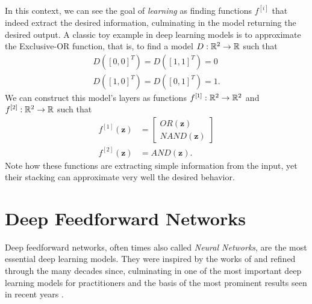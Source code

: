 In this context, we can see the goal of \textit{learning} as finding functions $f^{[i]}$ that indeed extract the desired information, culminating in the model returning the desired output.
A classic toy example in deep learning models is to approximate the Exclusive-OR function, that is, to find a model $D : \mathbb{R}^2 \to \mathbb{R}$ such that
\begin{align*}
    D([0,0]^T) = D([1,1]^T) = 0 \\
    D([1,0]^T) = D([0,1]^T) = 1 
.\end{align*}
We can construct this model's layers as functions $f^{[1]}:\mathbb{R}^2\to\mathbb{R}^2$ and $f^{[2]}:\mathbb{R}^2\to\mathbb{R}$ such that
\begin{align*}
    f^{[1]}(\bm{z}) &= \begin{bmatrix}
    OR(\bm{z}) \\
    NAND(\bm{z})
    \end{bmatrix} \\
    f^{[2]}(\bm{z}) &= AND(\bm{z})
.\end{align*}
Note how these functions are extracting simple information from the input, yet their stacking can approximate very well the desired behavior.

\section{Deep Feedforward Networks}\label{sec:neural-nets}

Deep feedforward networks, often times also called \emph{Neural Networks}\footnotemark, are the most essential deep learning models.
They were inspired by the works of \textcite{rosenblatt_perceptron_1957} and refined through the many decades since, culminating in one of the most important deep learning models for practitioners and the basis of the most prominent results seen in recent years \cite{goodfellow_deep_2016}.

